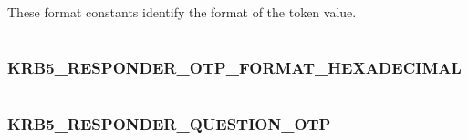 \documentclass[letterpaper,10pt,english]{sphinxmanual}
\begin{document}
\begin{fulllineitems}
\label{appdev/refs/macros/KRB5_RESPONDER_OTP_FORMAT_DECIMAL:KRB5_RESPONDER_OTP_FORMAT_DECIMAL}
\end{fulllineitems}


These format constants identify the format of the token value.

\begin{tabulary}{\linewidth}{|L|L|}
\hline

 & 
\\\hline
\end{tabulary}



\subsubsection{KRB5\_RESPONDER\_OTP\_FORMAT\_HEXADECIMAL}
\label{appdev/refs/macros/KRB5_RESPONDER_OTP_FORMAT_HEXADECIMAL:krb5-responder-otp-format-hexadecimal-data}\label{appdev/refs/macros/KRB5_RESPONDER_OTP_FORMAT_HEXADECIMAL::doc}\label{appdev/refs/macros/KRB5_RESPONDER_OTP_FORMAT_HEXADECIMAL:krb5-responder-otp-format-hexadecimal}

\begin{fulllineitems}
\label{appdev/refs/macros/KRB5_RESPONDER_OTP_FORMAT_HEXADECIMAL:KRB5_RESPONDER_OTP_FORMAT_HEXADECIMAL}
\end{fulllineitems}


\begin{tabulary}{\linewidth}{|L|L|}
\hline

 & 
\\\hline
\end{tabulary}



\subsubsection{KRB5\_RESPONDER\_QUESTION\_OTP}
\label{appdev/refs/macros/KRB5_RESPONDER_QUESTION_OTP:krb5-responder-question-otp}\label{appdev/refs/macros/KRB5_RESPONDER_QUESTION_OTP:krb5-responder-question-otp-data}\label{appdev/refs/macros/KRB5_RESPONDER_QUESTION_OTP::doc}
\end{document}
